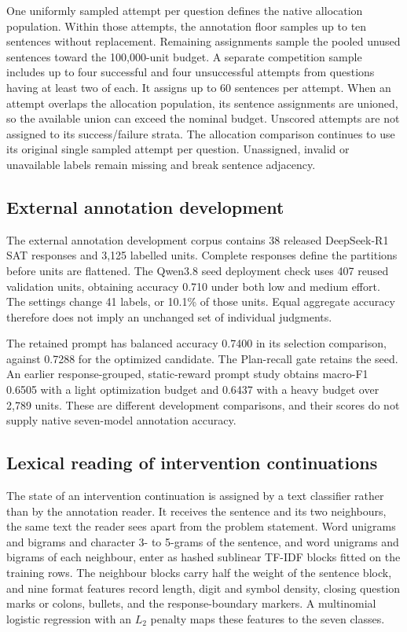 One uniformly sampled attempt per question defines the native allocation population.
%
Within those attempts, the annotation floor samples up to ten sentences without replacement.
%
Remaining assignments sample the pooled unused sentences toward the 100,000-unit budget.
%
A separate competition sample includes up to four successful and four unsuccessful attempts from questions having at least two of each.
%
It assigns up to 60 sentences per attempt.
%
When an attempt overlaps the allocation population, its sentence assignments are unioned, so the available union can exceed the nominal budget.
%
Unscored attempts are not assigned to its success/failure strata.
%
The allocation comparison continues to use its original single sampled attempt per question.
%
Unassigned, invalid or unavailable labels remain missing and break sentence adjacency.
%

\subsection{External annotation development}

The external annotation development corpus contains 38 released DeepSeek-R1 SAT responses and 3,125 labelled units.
%
Complete responses define the partitions before units are flattened.
%
The Qwen3.8 seed deployment check uses 407 reused validation units, obtaining accuracy 0.710 under both low and medium effort.
%
The settings change 41 labels, or 10.1\% of those units.
%
Equal aggregate accuracy therefore does not imply an unchanged set of individual judgments.
%

The retained prompt has balanced accuracy 0.7400 in its selection comparison, against 0.7288 for the optimized candidate.
%
The Plan-recall gate retains the seed.
%
An earlier response-grouped, static-reward prompt study obtains macro-F1 0.6505 with a light optimization budget and 0.6437 with a heavy budget over 2,789 units.
%
These are different development comparisons, and their scores do not supply native seven-model annotation accuracy.
%

\subsection{Lexical reading of intervention continuations}
\label{app:lexical-readout}

The state of an intervention continuation is assigned by a text classifier rather than by the annotation reader.
%
It receives the sentence and its two neighbours, the same text the reader sees apart from the problem statement.
%
Word unigrams and bigrams and character 3- to 5-grams of the sentence, and word unigrams and bigrams of each neighbour, enter as hashed sublinear TF-IDF blocks fitted on the training rows.
%
The neighbour blocks carry half the weight of the sentence block, and nine format features record length, digit and symbol density, closing question marks or colons, bullets, and the response-boundary markers.
%
A multinomial logistic regression with an $L_2$ penalty maps these features to the seven classes.
%

